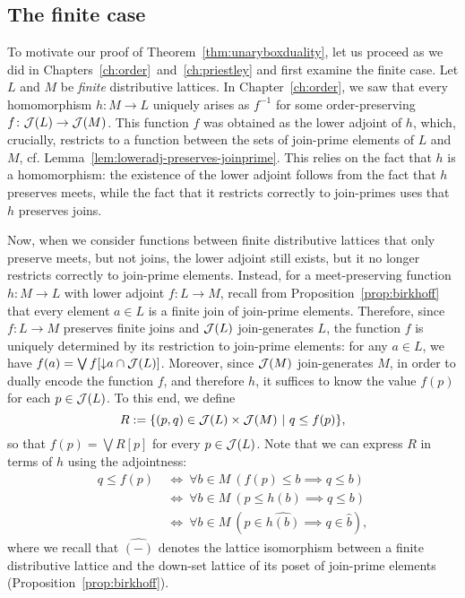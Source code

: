 \subsection*{The finite case}
To motivate our proof of Theorem~\ref{thm:unaryboxduality}, let us proceed as we did in Chapters~\ref{ch:order}~and~\ref{ch:priestley} and first examine the finite case. Let $L$ and $M$ be \emph{finite} distributive lattices. In Chapter~\ref{ch:order}, we saw that every homomorphism $h \colon M \to L$ uniquely arises as $f^{-1}$ for some order-preserving $f \colon \mathcal{J}(L) \to \mathcal{J}(M)$. This function $f$ was obtained as the lower adjoint of $h$, which, crucially, restricts to a function between the sets of join-prime elements of $L$ and $M$, cf.  Lemma~\ref{lem:loweradj-preserves-joinprime}. This relies on the fact that $h$ is a homomorphism: the existence of the lower adjoint follows from the fact that $h$ preserves meets, while the fact that it restricts correctly to join-primes uses that $h$ preserves joins.

Now, when we consider functions between finite distributive lattices that only preserve meets, but not joins, the lower adjoint still exists, but it no longer restricts correctly to join-prime elements. Instead, for a meet-preserving function $h \colon M \to L$ with lower adjoint $f \colon L \to M$, recall from Proposition~\ref{prop:birkhoff} that every element $a \in L$ is a finite join of join-prime elements. Therefore, since $f \colon L \to M$ preserves finite joins and $\mathcal{J}(L)$ join-generates $L$, the function $f$ is uniquely determined by its restriction to join-prime elements: for any $a \in L$, we have $f(a) = \bigvee f[{\downarrow} a \cap \mathcal{J}(L)]$. Moreover, since $\mathcal{J}(M)$ join-generates $M$, in order to dually encode the function $f$, and therefore $h$, it suffices to know the value $f(p)$ for each $p \in \mathcal{J}(L)$. To this end, we define
\begin{equation} \label{eq:dualrelation}
	R := \{(p,q) \in \mathcal{J}(L) \times \mathcal{J}(M) \ | \ q \leq f(p)\},
\end{equation} 
so that $f(p)=\bigvee R[p]$ for every $p \in \mathcal{J}(L)$.
Note that we can express $R$ in terms of $h$ using the adjointness:
\begin{align*}
q \leq f(p)\ &\iff\ \forall b\in M \ ( f(p)\leq b \implies q\leq b )\\
                 &\iff\ \forall b\in M \ ( p\leq h(b) \implies q\leq b )\\
                 &\iff \ \forall b\in M \ ( p\in \widehat{h(b)} \implies q\in\widehat{b} ),
\end{align*}
where we recall that $\widehat{(-)}$ denotes the lattice isomorphism between a finite distributive lattice and the down-set lattice of its poset of join-prime elements (Proposition~\ref{prop:birkhoff}). 

